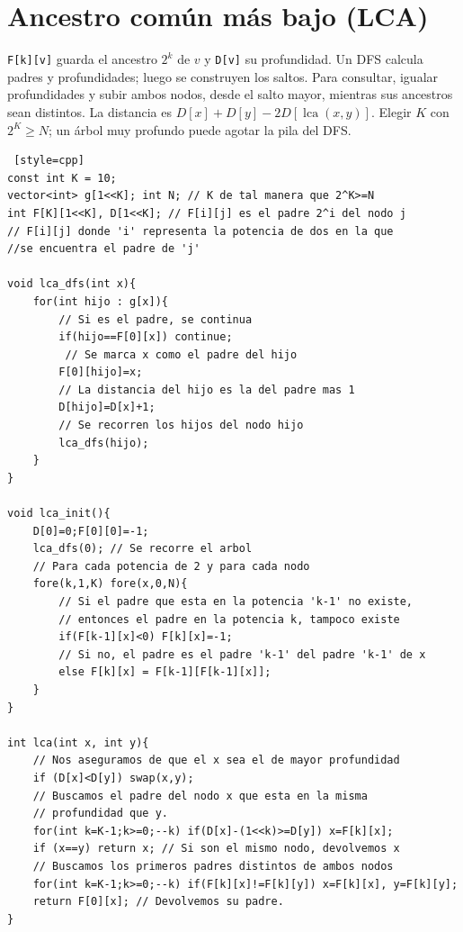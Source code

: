 \section{Ancestro com\'un m\'as bajo (LCA)}

\texttt{F[k][v]} guarda el ancestro $2^k$ de $v$ y \texttt{D[v]} su
profundidad. Un DFS calcula padres y profundidades; luego se construyen
los saltos. Para consultar, igualar profundidades y subir ambos nodos,
desde el salto mayor, mientras sus ancestros sean distintos.
La distancia es $D[x]+D[y]-2D[\operatorname{lca}(x,y)]$.
Elegir $K$ con $2^K\ge N$; un \'arbol muy profundo puede agotar la pila del DFS.

\begin{lstlisting} [style=cpp]
const int K = 10;
vector<int> g[1<<K]; int N; // K de tal manera que 2^K>=N
int F[K][1<<K], D[1<<K]; // F[i][j] es el padre 2^i del nodo j
// F[i][j] donde 'i' representa la potencia de dos en la que 
//se encuentra el padre de 'j'

void lca_dfs(int x){
    for(int hijo : g[x]){
        // Si es el padre, se continua
        if(hijo==F[0][x]) continue;
         // Se marca x como el padre del hijo
        F[0][hijo]=x;
        // La distancia del hijo es la del padre mas 1
        D[hijo]=D[x]+1;
        // Se recorren los hijos del nodo hijo
        lca_dfs(hijo); 
    }
}

void lca_init(){
    D[0]=0;F[0][0]=-1;
    lca_dfs(0); // Se recorre el arbol
    // Para cada potencia de 2 y para cada nodo
    fore(k,1,K) fore(x,0,N){ 
        // Si el padre que esta en la potencia 'k-1' no existe, 
        // entonces el padre en la potencia k, tampoco existe
        if(F[k-1][x]<0) F[k][x]=-1; 
        // Si no, el padre es el padre 'k-1' del padre 'k-1' de x
        else F[k][x] = F[k-1][F[k-1][x]]; 
    }
}

int lca(int x, int y){
    // Nos aseguramos de que el x sea el de mayor profundidad
    if (D[x]<D[y]) swap(x,y); 
    // Buscamos el padre del nodo x que esta en la misma 
    // profundidad que y.
    for(int k=K-1;k>=0;--k) if(D[x]-(1<<k)>=D[y]) x=F[k][x]; 
    if (x==y) return x; // Si son el mismo nodo, devolvemos x
    // Buscamos los primeros padres distintos de ambos nodos
    for(int k=K-1;k>=0;--k) if(F[k][x]!=F[k][y]) x=F[k][x], y=F[k][y];
    return F[0][x]; // Devolvemos su padre.
}
\end{lstlisting}



